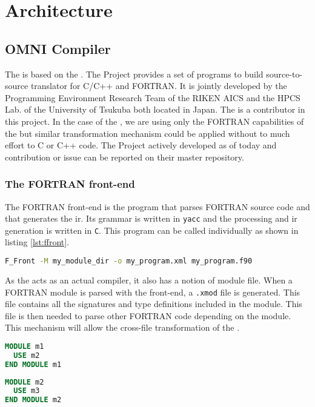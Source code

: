 \chapter{Architecture}
\section{OMNI Compiler}
The \clawfcomp is based on the \omni\cite{omni:website}. The \omni Project
provides a set of programs to build source-to-source translator for C/C++
and FORTRAN. It is jointly developed by the Programming Environment Research
Team of the RIKEN AICS and the HPCS Lab. of the University of Tsukuba both
located in Japan. The \clawfcomp is a contributor in this project. 
In the case of the \clawfcomp, we are using only the FORTRAN
capabilities of the \omni but similar transformation mechanism could be
applied without to much effort to C or C++ code. The \omni Project
actively developed as of today and contribution or issue can be reported on 
their master repository\cite{omni:github}.

\subsection{The FORTRAN front-end}
The FORTRAN front-end is the program that parses FORTRAN source code and that
generates the \gls{ir}. Its grammar is written in \lstinline|yacc| and the
processing and \gls{ir} generation is written in \lstinline|C|. This program
can be called individually as shown in listing \ref{lst:ffront}.

\begin{lstlisting}[label=lst:ffront, language=Bash, caption=Call F\_Front]
F_Front -M my_module_dir -o my_program.xml my_program.f90
\end{lstlisting}

As the \omni acts as an actual compiler, it also has a notion of module file. 
When a FORTRAN module is parsed with the front-end, a \lstinline|.xmod| file is
generated. This file contains all the signatures and type definitions included 
in the module. This file is then needed to parse other FORTRAN code depending 
on the module. This mechanism will allow the cross-file transformation of the
\clawfcomp.

\begin{lstlisting}[label=lst:m1, language=Fortran, caption=module\_m1.f90]
MODULE m1
  USE m2
END MODULE m1
\end{lstlisting}

\begin{lstlisting}[label=lst:m2, language=Fortran, caption=module\_m2.f90]
MODULE m2
  USE m3
END MODULE m2
\end{lstlisting}


